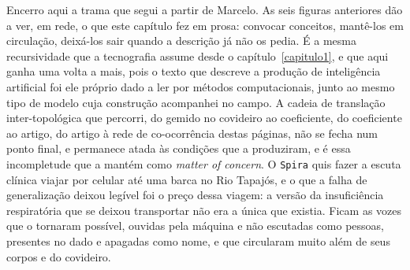Encerro aqui a trama que segui a partir de Marcelo. As seis figuras anteriores dão a ver, em rede, o que este capítulo fez em prosa: convocar conceitos, mantê-los em circulação, deixá-los sair quando a descrição já não os pedia. É a mesma recursividade que a tecnografia assume desde o capítulo~\ref{capitulo1}, e que aqui ganha uma volta a mais, pois o texto que descreve a produção de inteligência artificial foi ele próprio dado a ler por métodos computacionais, junto ao mesmo tipo de modelo cuja construção acompanhei no campo. A cadeia de translação inter-topológica que percorri, do gemido no covideiro ao coeficiente, do coeficiente ao artigo, do artigo à rede de co-ocorrência destas páginas, não se fecha num ponto final, e permanece atada às condições que a produziram, e é essa incompletude que a mantém como \textit{matter of concern}. O \texttt{Spira} quis fazer a escuta clínica viajar por celular até uma barca no Rio Tapajós, e o que a falha de generalização deixou legível foi o preço dessa viagem: a versão da insuficiência respiratória que se deixou transportar não era a única que existia. Ficam as vozes que o tornaram possível, ouvidas pela máquina e não escutadas como pessoas, presentes no dado e apagadas como nome, e que circularam muito além de seus corpos e do covideiro. 